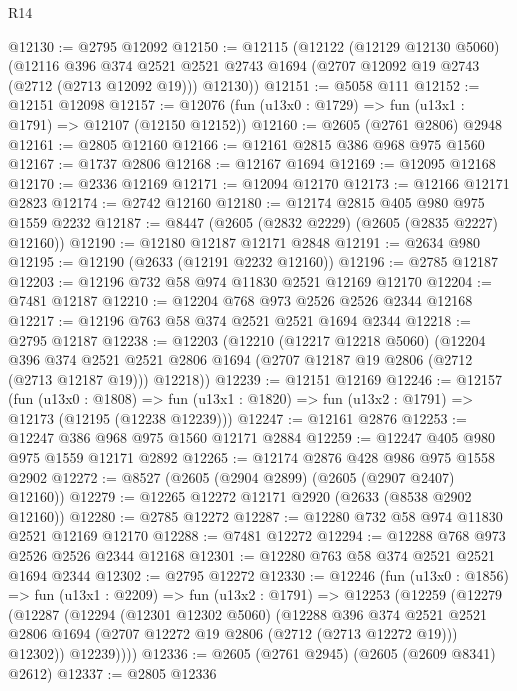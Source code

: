 \begin{lexlean}{R14}
\begin{coremodule}
@12130 := @2795 @12092
@12150 := @12115
    (@12122
      (@12129 @12130 @5060)
      (@12116
        @396
        @374
        @2521
        @2521
        @2743
        @1694
        (@2707 @12092 @19 @2743 (@2712 (@2713 @12092 @19)))
        @12130))
@12151 := @5058 @111
@12152 := @12151 @12098
@12157 := @12076 (fun (u13x0 : @1729) => fun (u13x1 : @1791) => @12107 (@12150 @12152))
@12160 := @2605 (@2761 @2806) @2948
@12161 := @2805 @12160
@12166 := @12161 @2815 @386 @968 @975 @1560
@12167 := @1737 @2806
@12168 := @12167 @1694
@12169 := @12095 @12168
@12170 := @2336 @12169
@12171 := @12094 @12170
@12173 := @12166 @12171 @2823
@12174 := @2742 @12160
@12180 := @12174 @2815 @405 @980 @975 @1559 @2232
@12187 := @8447 (@2605 (@2832 @2229) (@2605 (@2835 @2227) @12160))
@12190 := @12180 @12187 @12171 @2848
@12191 := @2634 @980
@12195 := @12190 (@2633 (@12191 @2232 @12160))
@12196 := @2785 @12187
@12203 := @12196 @732 @58 @974 @11830 @2521 @12169 @12170
@12204 := @7481 @12187
@12210 := @12204 @768 @973 @2526 @2526 @2344 @12168
@12217 := @12196 @763 @58 @374 @2521 @2521 @1694 @2344
@12218 := @2795 @12187
@12238 := @12203
    (@12210
      (@12217 @12218 @5060)
      (@12204
        @396
        @374
        @2521
        @2521
        @2806
        @1694
        (@2707 @12187 @19 @2806 (@2712 (@2713 @12187 @19)))
        @12218))
@12239 := @12151 @12169
@12246 := @12157
    (fun (u13x0 : @1808) =>
    fun (u13x1 : @1820) => fun (u13x2 : @1791) => @12173 (@12195 (@12238 @12239)))
@12247 := @12161 @2876
@12253 := @12247 @386 @968 @975 @1560 @12171 @2884
@12259 := @12247 @405 @980 @975 @1559 @12171 @2892
@12265 := @12174 @2876 @428 @986 @975 @1558 @2902
@12272 := @8527 (@2605 (@2904 @2899) (@2605 (@2907 @2407) @12160))
@12279 := @12265 @12272 @12171 @2920 (@2633 (@8538 @2902 @12160))
@12280 := @2785 @12272
@12287 := @12280 @732 @58 @974 @11830 @2521 @12169 @12170
@12288 := @7481 @12272
@12294 := @12288 @768 @973 @2526 @2526 @2344 @12168
@12301 := @12280 @763 @58 @374 @2521 @2521 @1694 @2344
@12302 := @2795 @12272
@12330 := @12246
    (fun (u13x0 : @1856) =>
    fun (u13x1 : @2209) =>
    fun (u13x2 : @1791) =>
    @12253
      (@12259
        (@12279
          (@12287
            (@12294
              (@12301 @12302 @5060)
              (@12288
                @396
                @374
                @2521
                @2521
                @2806
                @1694
                (@2707 @12272 @19 @2806 (@2712 (@2713 @12272 @19)))
                @12302))
            @12239))))
@12336 := @2605 (@2761 @2945) (@2605 (@2609 @8341) @2612)
@12337 := @2805 @12336

\end{coremodule}
\end{lexlean}

